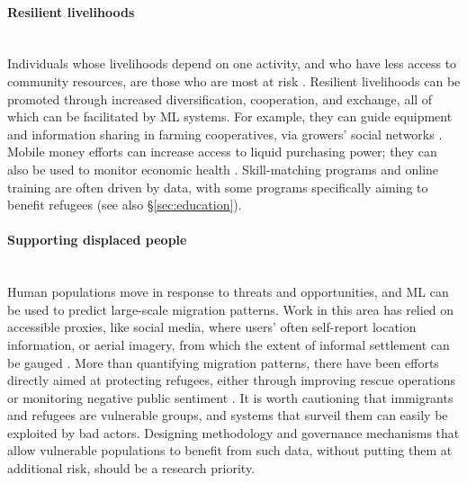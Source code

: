 \documentclass[11pt]{report}
\newcommand{\Gap}{\texorpdfstring{\hfill}{}}
\newcommand{\HighRisk}{\texorpdfstring{{\small\emph{\color{orange}{\fbox{Uncertain Impact}}}}}{}}
\newcommand{\Longterm}{\texorpdfstring{{\small\emph{\color{OliveGreen}{\fbox{Long-term}}}}}{}}
\begin{document}
\paragraph*{Resilient livelihoods}\Gap\mbox{}\\Individuals whose
livelihoods depend on one activity, and who have less access to community
resources, are those who are most at risk \cite{agrawal2009climate,
rodima2012social}. Resilient livelihoods can be promoted through increased diversification, cooperation, and exchange, all of which can be facilitated by ML systems. 
For example, they can guide equipment and information sharing in farming cooperatives,
via growers' social networks \cite{assefa}. Mobile money efforts can increase access to
liquid purchasing power; they can also be used to monitor economic health \cite{un_global_pulse_2013, frias2012computing}.
Skill-matching programs and online training are often driven by data, with some
programs specifically aiming to benefit refugees \cite{marivate2017employment, bansak2018improving, un_global_pulse_2017_jakarta} (see also \S{\ref{sec:education}}).

\paragraph*{Supporting displaced people}\Gap\textbf{\Longterm\HighRisk}\mbox{}\\ Human populations move in response to threats and opportunities, and ML can be used to predict large-scale migration patterns. Work in this area has relied on
accessible proxies, like social media, where users' often self-report location
information, or aerial imagery, from which the extent of informal settlement can
be gauged \cite{zagheni2017leveraging, isaacman2017climate,
blumenstock2012inferring, quinn2018humanitarian}. More than
quantifying migration patterns, there have been efforts directly aimed at
protecting refugees, either through improving rescue operations
\cite{pham2018data, lomonaco2018intelligent} or monitoring negative public
sentiment \cite{un_global_pulse_2017}.
It is worth cautioning that immigrants and refugees are
vulnerable groups, and systems that surveil them can easily be exploited by bad
actors. Designing methodology and governance mechanisms that allow vulnerable
populations to benefit from such data, without putting them at additional risk,
should be a research priority.
\end{document}
